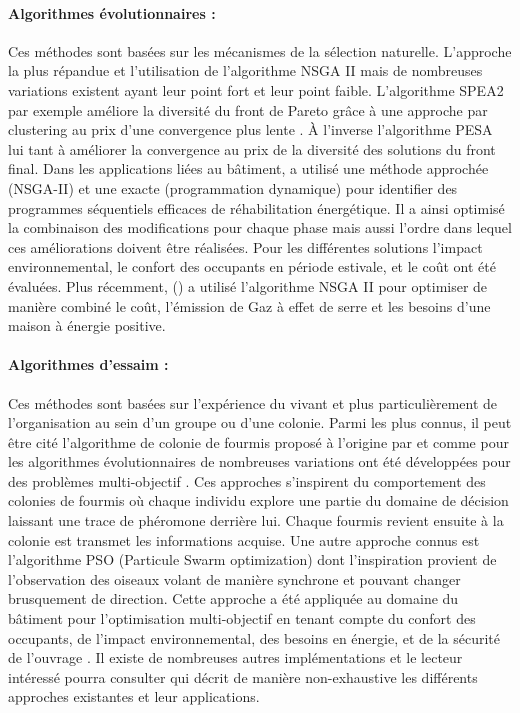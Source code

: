 \paragraph{Algorithmes évolutionnaires :} %
\label{par:algorithmes_évolutionnaires}
Ces méthodes sont basées sur les mécanismes de la sélection naturelle. L’approche la plus
répandue et l’utilisation de l’algorithme NSGA II \parencite{Deb2002182} mais de nombreuses
variations existent ayant leur point fort et leur point faible. L’algorithme
SPEA2 par exemple améliore la diversité du front de Pareto grâce à une approche par
clustering au prix d’une convergence plus lente \parencite{Zitzler2001}. À l’inverse
l’algorithme PESA lui tant à améliorer la convergence au prix de la diversité des
solutions du front final. Dans les applications liées au bâtiment, \cite{Rivallain2013}
a utilisé une méthode approchée (NSGA-II) et une exacte (programmation dynamique)
pour identifier des programmes séquentiels efficaces de réhabilitation énergétique.
Il a ainsi optimisé la combinaison des modifications pour chaque phase mais aussi l’ordre
dans lequel ces améliorations doivent être réalisées.
Pour les différentes solutions l’impact environnemental, le confort des occupants en
période estivale, et le coût ont été évaluées.
Plus récemment, () a utilisé l’algorithme NSGA II pour
optimiser de manière combiné le coût, l’émission de Gaz à effet de serre et
les besoins d’une maison à énergie positive.

\paragraph{Algorithmes d’essaim :} %
\label{par:algorithmes_d_essaim}
Ces méthodes sont basées sur l’expérience du vivant et plus particulièrement de
l’organisation au sein d’un groupe ou d’une colonie. Parmi les plus connus, il peut être
cité l’algorithme de colonie de fourmis proposé à l’origine par \cite{Colorni1992509}
et comme pour les algorithmes évolutionnaires de nombreuses variations ont été développées
pour des problèmes multi-objectif \parencite{MichaelGuntsch2003,Shea2006627}.
Ces approches s’inspirent du comportement des colonies de fourmis où chaque individu
explore une partie du domaine de décision laissant une trace de phéromone derrière lui.
Chaque fourmis revient ensuite à la colonie est transmet les informations acquise.
Une autre approche connus est l’algorithme PSO (Particule Swarm optimization) dont
l’inspiration provient de l’observation des oiseaux volant de manière synchrone et
pouvant changer brusquement de direction. Cette approche a été appliquée au domaine
du bâtiment pour l’optimisation multi-objectif en tenant compte du confort des occupants,
de l’impact environnemental, des besoins en énergie, et de la sécurité de l’ouvrage \parencite{Armand-Decker2015}.
Il existe de nombreuses autres implémentations et le lecteur intéressé pourra consulter
\cite{Aboul-EllaHassanien2015} qui décrit de manière non-exhaustive les différents
approches existantes et leur applications.


